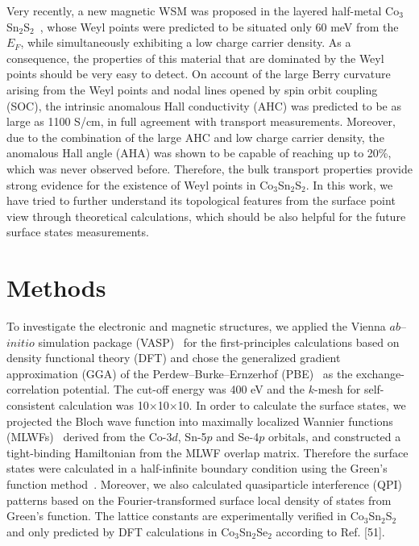 \documentclass[aps,prb,reprint,superscriptaddress,amssymb,amsmath]{revtex4-1}
\begin{document}
Very recently, a new magnetic WSM was proposed in the layered half-metal Co$_3$Sn$_2$S$_2$~\cite{Enk_2017,Wang2017}, 
whose Weyl points were predicted to be situated only 60 meV from the $E_F$, 
while simultaneously exhibiting a low charge carrier density. 
As a consequence, the properties of this material that are dominated by the Weyl points should be very easy to detect. 
On account of the large Berry curvature arising from the Weyl points and nodal lines opened by spin orbit coupling (SOC), 
the intrinsic anomalous Hall conductivity (AHC) was predicted to be as large as 1100 S/cm, in full agreement with transport measurements. 
Moreover, due to the combination of the large AHC and low charge carrier density, 
the anomalous Hall angle (AHA) was shown to be capable of reaching up to 20\%, which was never observed before. 
Therefore, the bulk transport properties provide strong evidence for the existence of Weyl points in Co$_3$Sn$_2$S$_2$. 
In this work, we have tried to further understand its topological features from the surface point view through
theoretical calculations, which should be also helpful for the future surface states measurements.

\section{Methods}
To investigate the electronic and magnetic structures, 
we applied the Vienna $ab$--$initio$ simulation package (VASP)~\cite{kresse1996} 
for the first-principles calculations based on density functional theory (DFT) 
and chose the generalized gradient approximation (GGA) of the Perdew--Burke--Ernzerhof (PBE)~\cite{perdew1996} as
the exchange-correlation potential. 
The cut-off energy was 400 eV and the $k$-mesh for self-consistent calculation was 10$\times$10$\times$10.
In order to calculate the surface states, we projected the Bloch wave function into maximally localized Wannier functions (MLWFs)~\cite{Mostofi2008}
derived from the Co-3$d$, Sn-5$p$ and Se-4$p$ orbitals, 
and constructed a tight-binding Hamiltonian from the MLWF overlap matrix. 
Therefore the surface states were calculated in a half-infinite boundary condition using the Green's function method~\cite{Sancho1984,Sancho1985}. 
Moreover, we also calculated quasiparticle interference (QPI) patterns based on the Fourier-transformed surface local density of states from Green's function. 
The lattice constants are experimentally verified in Co$_3$Sn$_2$S$_2$~\cite{Enk_2017} 
and only predicted by DFT calculations in Co$_3$Sn$_2$Se$_2$ according to Ref. [51].
\end{document}
